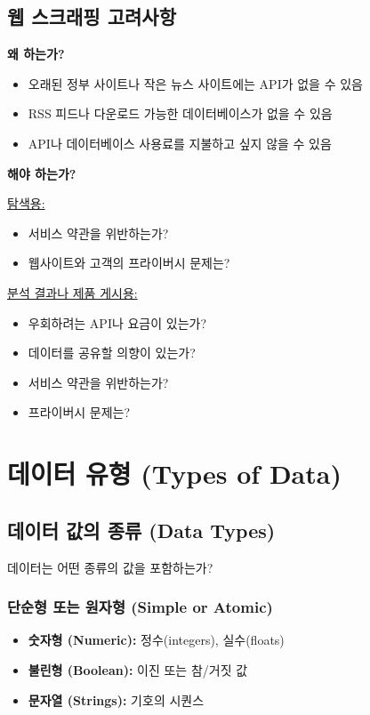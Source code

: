 \documentclass[12pt,a4paper]{article}
\begin{document}
\subsection{웹 스크래핑 고려사항}

\textbf{왜 하는가?}
\begin{itemize}
    \item 오래된 정부 사이트나 작은 뉴스 사이트에는 API가 없을 수 있음
    \item RSS 피드나 다운로드 가능한 데이터베이스가 없을 수 있음
    \item API나 데이터베이스 사용료를 지불하고 싶지 않을 수 있음
\end{itemize}

\textbf{해야 하는가?}

\underline{탐색용:}
\begin{itemize}
    \item 서비스 약관을 위반하는가?
    \item 웹사이트와 고객의 프라이버시 문제는?
\end{itemize}

\underline{분석 결과나 제품 게시용:}
\begin{itemize}
    \item 우회하려는 API나 요금이 있는가?
    \item 데이터를 공유할 의향이 있는가?
    \item 서비스 약관을 위반하는가?
    \item 프라이버시 문제는?
\end{itemize}

\section{데이터 유형 (Types of Data)}

\subsection{데이터 값의 종류 (Data Types)}

데이터는 어떤 종류의 값을 포함하는가?

\subsubsection{단순형 또는 원자형 (Simple or Atomic)}
\begin{itemize}
    \item \textbf{숫자형 (Numeric):} 정수(integers), 실수(floats)
    \item \textbf{불린형 (Boolean):} 이진 또는 참/거짓 값
    \item \textbf{문자열 (Strings):} 기호의 시퀀스
\end{itemize}
\end{document}
